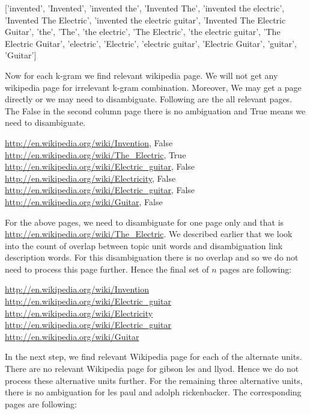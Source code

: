 \documentclass[11pt]{article}
\begin{document}
['invented', 'Invented', 'invented the', 'Invented The', 'invented the electric', 'Invented The Electric', 'invented the electric guitar', 'Invented The Electric Guitar', 'the', 'The', 'the electric', 'The Electric', 'the electric guitar', 'The Electric Guitar', 'electric', 'Electric', 'electric guitar', 'Electric Guitar', 'guitar', 'Guitar'] 

Now for each k-gram we find relevant wikipedia page. We will not get any wikipedia page for irrelevant k-gram combination.  Moreover, We may get a page directly or we may need to disambiguate. Following are the all relevant pages. The False in the second column page there is no ambiguation and True means we need to disambiguate.

\url{http://en.wikipedia.org/wiki/Invention}, False\\
\url{http://en.wikipedia.org/wiki/The_Electric}, True \\
\url{http://en.wikipedia.org/wiki/Electric_guitar}, False\\
\url{http://en.wikipedia.org/wiki/Electricity}, False \\
\url{http://en.wikipedia.org/wiki/Electric_guitar}, False \\
\url{http://en.wikipedia.org/wiki/Guitar}, False

For the above pages, we need to disambiguate for one page only and that is \url{http://en.wikipedia.org/wiki/The_Electric}. We described earlier that we look into the count of overlap between topic unit words and disambiguation link description words. For this disambiguation there is no overlap and so we do not need to process this page further. Hence the final set of $n$ pages are following:

\url{http://en.wikipedia.org/wiki/Invention} \\
\url{http://en.wikipedia.org/wiki/Electric_guitar} \\
\url{http://en.wikipedia.org/wiki/Electricity} \\
\url{http://en.wikipedia.org/wiki/Electric_guitar} \\
\url{http://en.wikipedia.org/wiki/Guitar}

In the next step, we find relevant Wikipedia page for each of the alternate units. There are no relevant Wikipedia page for  gibson les and llyod. Hence we do not process these alternative units further. For the remaining three alternative units, there is no ambiguation for les paul and adolph rickenbacker. The corresponding pages are following:
\end{document}
